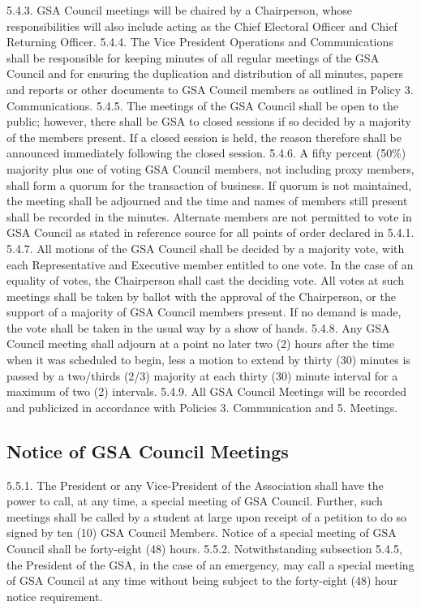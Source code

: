 5.4.3. GSA Council meetings will be chaired by a Chairperson, whose 
responsibilities will also include acting as the Chief Electoral Officer 
and Chief Returning Officer. 
5.4.4. The Vice President Operations and Communications shall be 
responsible for keeping minutes of all regular meetings of the GSA 
Council and for ensuring the duplication and distribution of all 
minutes, papers and reports or other documents to GSA Council 
members as outlined in Policy 3. Communications. 
5.4.5. The meetings of the GSA Council shall be open to the public; 
however, there shall be GSA to closed sessions if so decided by a 
majority of the members present. If a closed session is held, the reason 
therefore shall be announced immediately following the closed 
session. 
5.4.6. A fifty percent (50\%) majority plus one of voting GSA Council 
members, not including proxy members, shall form a quorum for the 
transaction of business. If quorum is not maintained, the meeting shall 
be adjourned and the time and names of members still present shall be 
recorded in the minutes. Alternate members are not permitted to vote 
in GSA Council as stated in reference source for all points of order 
declared in 5.4.1. 
5.4.7. All motions of the GSA Council shall be decided by a majority vote, 
with each Representative and Executive member entitled to one vote. 
In the case of an equality of votes, the Chairperson shall cast the 
deciding vote. All votes at such meetings shall be taken by ballot with 
the approval of the Chairperson, or the support of a majority of GSA 
Council members present. If no demand is made, the vote shall be 
taken in the usual way by a show of hands. 
5.4.8. Any GSA Council meeting shall adjourn at a point no later two (2) 
hours after the time when it was scheduled to begin, less a motion to 
extend by thirty (30) minutes is passed by a two/thirds (2/3) majority 
at each thirty (30) minute interval for a maximum of two (2) intervals. 
5.4.9. All GSA Council Meetings will be recorded and publicized in accordance with Policies 3. Communication and 5. Meetings. 
\subsection{Notice of GSA Council Meetings }
5.5.1. The President or any Vice-President of the Association shall have the 
power to call, at any time, a special meeting of GSA Council. Further, 
such meetings shall be called by a student at large upon receipt of a 
petition to do so signed by ten (10) GSA Council Members. Notice of 
a special meeting of GSA Council shall be forty-eight (48) hours. 
5.5.2. Notwithstanding subsection 5.4.5, the President of the GSA, in the 
case of an emergency, may call a special meeting of GSA Council at 
any time without being subject to the forty-eight (48) hour notice 
requirement. 
